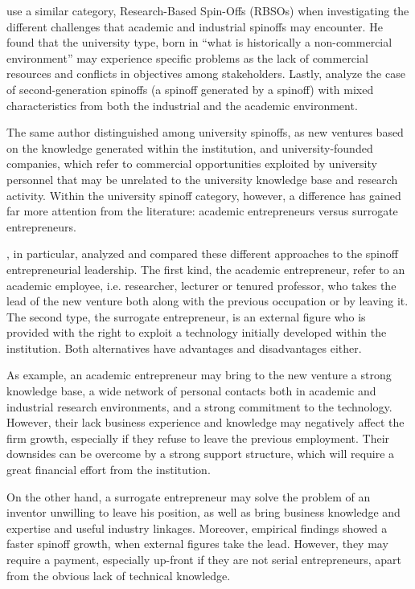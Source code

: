 \citet{Mustar2006} use a similar category, Research-Based Spin-Offs (RBSOs) when investigating the different challenges that academic and industrial spinoffs may encounter. He found that the university type, born in \enquote{what is historically a non-commercial environment} may experience specific problems as the lack of commercial resources and conflicts in objectives among stakeholders. Lastly, \citet{Leitch2005} analyze the case of  second-generation spinoffs (a spinoff generated by a spinoff) with mixed characteristics from both the industrial and the academic environment.

The same author distinguished among university spinoffs, as new ventures based on the knowledge generated within the institution, and university-founded companies, which refer to commercial opportunities exploited by university personnel that may be unrelated to the university knowledge base and research activity. Within the university spinoff category, however, a difference has gained far more attention from the literature: academic entrepreneurs versus surrogate entrepreneurs.

\citet{Radosevich1955}, in particular, analyzed and compared these different approaches to the spinoff entrepreneurial leadership. The first kind, the academic entrepreneur, refer to an academic employee, i.e. researcher, lecturer or tenured professor, who takes the lead of the new venture both along with the previous occupation or by leaving it. The second type, the surrogate entrepreneur, is an external figure who is provided with the right to exploit a technology initially developed within the institution. Both alternatives have advantages and disadvantages either.

As example, an academic entrepreneur may bring to the new venture a strong knowledge base, a wide network of personal contacts both in academic and industrial research environments, and a strong commitment to the technology. However, their lack business experience and knowledge may negatively affect the firm growth, especially if they refuse to leave the previous employment. Their downsides can be overcome by a strong support structure, which will require a great financial effort from the institution. 

On the other hand, a surrogate entrepreneur may solve the problem of an inventor unwilling to leave his position, as well as bring business knowledge and expertise and useful industry linkages. Moreover, empirical findings showed a faster spinoff growth, when external figures take the lead. However, they may require a payment, especially up-front if they are not serial entrepreneurs, apart from the obvious lack of technical knowledge. 

